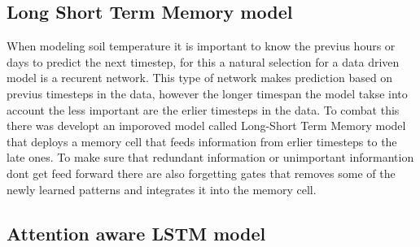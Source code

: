 \subsection{Long Short Term Memory model}\label{sec:theory:lstm}

When modeling soil temperature it is important to know the previus hours or days to predict the next timestep, for this a natural selection for a data driven model is a recurent network. This type of network makes prediction based on previus timesteps in the data, however the longer timespan the model takse into account the less important are the erlier timesteps in the data. To combat this there was developt an imporoved model called Long-Short Term Memory model\cite{hochreiter_long_1997} that deploys a memory cell that feeds information from erlier timesteps to the late ones. To make sure that redundant information or unimportant informantion dont get feed forward there are also forgetting gates that removes some of the newly learned patterns and integrates it into the memory cell. 



\subsection[ILSTM]{Attention aware LSTM model}\label{sec:theory:Ilstm}

